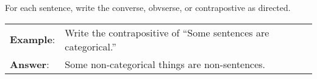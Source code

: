 






\practiceproblems

\noindent \problempart For each sentence, write the converse, obvserse, or contrapostive as directed.

\begin{longtabu}{p{.1\linewidth}p{.9\linewidth}}
\textbf{Example}: & Write the contrapositive of ``Some sentences are categorical.''\\
\textbf{Answer}: & Some non-categorical things are non-sentences. \\
\end{longtabu}


